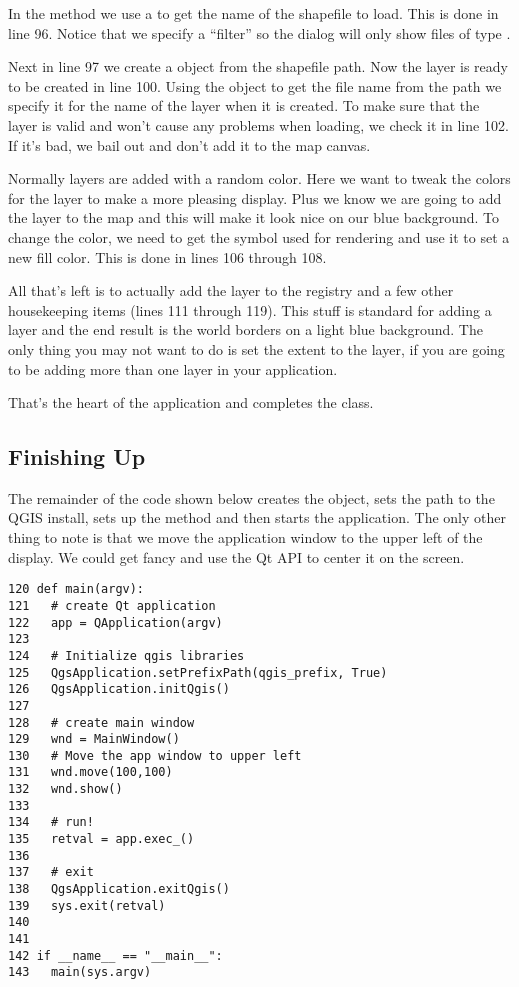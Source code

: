 In the  method we use a  to get the
name of the shapefile to load. This is done in line 96.
Notice that we specify a ``filter'' so the dialog will only show files of
type .

Next in line 97 we create a  object from the shapefile
path.  Now the layer is ready to be created in line 100. Using the
 object to get the file name from the path we specify it 
for the name of the layer when it is created.  To make sure that the layer is 
valid and won't cause any problems when loading, we check it in line 102. If
it's bad, we bail out and don't add it to the map canvas.

Normally layers are added with a random color. Here we want to tweak the
colors for the layer to make a more pleasing display. Plus we know we are
going to add the  layer to the map and this will make
it look nice on our blue background. To change the color, we need to get the
symbol used for rendering and use it to set a new fill color. This is done in
lines 106 through 108. 

All that's left is to actually add the layer to the registry and a few other
housekeeping items (lines 111 through 119). This stuff is standard for adding
a layer and the end result is the world borders on a light blue background.
The only thing you may not want to do is set the extent to the layer, if you
are going to be adding more than one layer in your application.

That's the heart of the application and completes the  class. 

\subsection{Finishing Up}

The remainder of the code shown below creates the 
object, sets the path to the QGIS install, sets up the  method
and then starts the application. The only other thing to note is that we move
the application window to the upper left of the display. We could get fancy
and use the Qt API to center it on the screen.

\begin{verbatim}
120 def main(argv):
121   # create Qt application
122   app = QApplication(argv)
123 
124   # Initialize qgis libraries
125   QgsApplication.setPrefixPath(qgis_prefix, True)
126   QgsApplication.initQgis()
127 
128   # create main window
129   wnd = MainWindow()
130   # Move the app window to upper left
131   wnd.move(100,100)
132   wnd.show()
133 
134   # run!
135   retval = app.exec_()
136   
137   # exit
138   QgsApplication.exitQgis()
139   sys.exit(retval)
140 
141 
142 if __name__ == "__main__":
143   main(sys.argv)
\end{verbatim}

